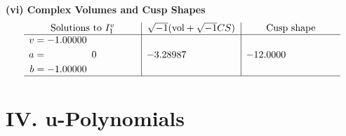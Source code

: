 \documentclass[1p]{elsarticle_modified}
\theoremstyle{definition}
\newcommand{\I}{\sqrt{-1}}
\begin{document}
\newpage\flushleft \textbf{(vi) Complex Volumes and Cusp Shapes}
$$\begin{array}{c|c|c}  
\text{Solutions to }I^v_{1}& \I (\text{vol} + \sqrt{-1}CS) & \text{Cusp shape}\\
 \hline 
\begin{aligned}
v &= -1.00000\phantom{ +0.000000I} \\
a &= \phantom{-0.000000 } 0 \\
b &= -1.00000\phantom{ +0.000000I}\end{aligned}
 & -3.28987\phantom{ +0.000000I} & -12.0000\phantom{ +0.000000I}\\
 \hline 
 \end{array}$$\newpage
\newpage\renewcommand{\arraystretch}{1}
\centering \section*{ IV. u-Polynomials}
\end{document}
